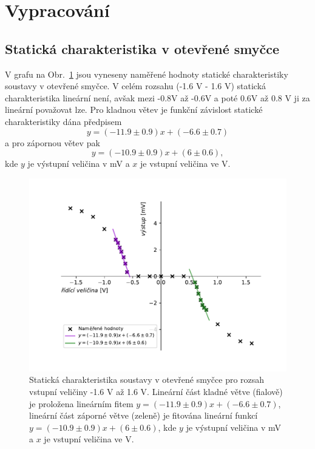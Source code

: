 \section{Vypracování}
	\subsection{Statická charakteristika v otevřené smyčce}
		V grafu na Obr.~\ref{fig:staticka} jsou vyneseny naměřené hodnoty statické charakteristiky soustavy v otevřené smyčce. 
		V celém rozsahu (-1.6 V - 1.6 V) statická charakteristika lineární není, avšak mezi -0.8V až -0.6V a poté 0.6V až 0.8 V ji za lineární považovat lze.
		Pro kladnou větev je funkční závislost statické charakteristiky dána předpisem $$y=(-11.9\pm 0.9)x+(-6.6\pm 0.7)$$ a pro zápornou větev pak $$y=(-10.9\pm 0.9)x+(6\pm 0.6),$$ 
		kde $y$ je výstupní veličina v mV a $x$ je vstupní veličina ve V. 
		\begin{figure}[!hbt] %
			\centering
			\includegraphics[]{img/graf_staticka.pdf} %
			\caption{Statická charakteristika soustavy v otevřené smyčce pro rozsah vstupní veličiny -1.6 V až 1.6 V. 
			Lineární část kladné větve (fialově) je proložena lineárním fitem $y=(-11.9\pm 0.9)x+(-6.6\pm 0.7)$, 
			lineární část záporné větve (zeleně) je fitována lineární funkcí $y=(-10.9\pm 0.9)x+(6\pm 0.6)$, 
			kde $y$ je výstupní veličina v mV a $x$ je vstupní veličina ve V.} %
			\label{fig:staticka} %
		\end{figure}


